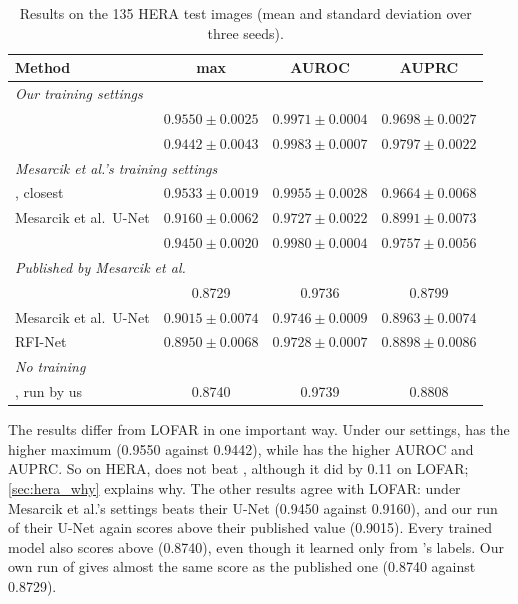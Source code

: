 \begin{table}[H]
  \centering
  \caption[Results on HERA]{Results on the 135 HERA test images (mean and
    standard deviation over three seeds).}
  \label{tab:hera}
  \footnotesize
  \setlength{\tabcolsep}{4pt}
  \begin{tabular}{lccc}
    \toprule
    Method & max \Fone{} & AUROC & AUPRC \\
    \midrule
    \multicolumn{4}{l}{\textit{Our training settings}} \\
    \tfunet{} & $\mathbf{0.9550 \pm 0.0025}$ & $0.9971 \pm 0.0004$ & $0.9698 \pm 0.0027$ \\
    \hybrid{} & $0.9442 \pm 0.0043$ & $\mathbf{0.9983 \pm 0.0007}$ & $\mathbf{0.9797 \pm 0.0022}$ \\
    \midrule
    \multicolumn{4}{l}{\textit{Mesarcik et al.'s training settings}} \\
    \tfunet{}, closest & $\mathbf{0.9533 \pm 0.0019}$ & $0.9955 \pm 0.0028$ & $0.9664 \pm 0.0068$ \\
    Mesarcik et al.\ U-Net & $0.9160 \pm 0.0062$ & $0.9727 \pm 0.0022$ & $0.8991 \pm 0.0073$ \\
    \hybrid{} & $0.9450 \pm 0.0020$ & $\mathbf{0.9980 \pm 0.0004}$ & $\mathbf{0.9757 \pm 0.0056}$ \\
    \midrule
    \multicolumn{4}{l}{\textit{Published by Mesarcik et al.}} \\
    \aoflagger{} & 0.8729 & 0.9736 & 0.8799 \\
    Mesarcik et al.\ U-Net & $\mathbf{0.9015 \pm 0.0074}$ & $\mathbf{0.9746 \pm 0.0009}$ & $\mathbf{0.8963 \pm 0.0074}$ \\
    RFI-Net & $0.8950 \pm 0.0068$ & $0.9728 \pm 0.0007$ & $0.8898 \pm 0.0086$ \\
    \midrule
    \multicolumn{4}{l}{\textit{No training}} \\
    \aoflagger{}, run by us & 0.8740 & 0.9739 & 0.8808 \\
    \bottomrule
  \end{tabular}
\end{table}

The results differ from LOFAR in one important way. Under our settings,
\tfunet{} has the higher maximum \Fone{} (0.9550 against 0.9442), while
\hybrid{} has the higher AUROC and AUPRC. So on HERA, \hybrid{} does not beat
\tfunet{}, although it did by 0.11 on LOFAR; \cref{sec:hera_why} explains why. The other
results agree with LOFAR: under Mesarcik et al.'s settings \hybrid{} beats their
U-Net (0.9450 against 0.9160), and our run of their U-Net again scores above
their published value (0.9015). Every trained model also scores above
\aoflagger{} (0.8740), even though it learned only from \aoflagger{}'s labels.
Our own run of \aoflagger{} gives almost the same score as the published one
(0.8740 against 0.8729).

